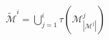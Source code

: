 \documentclass[preview]{standalone}
\begin{document}
\begin{align*}
\tilde{\mathcal{M}}^{i} = \bigcup_{j=1}^{i}\tau(\mathcal{M}_{|\mathcal{M}^{j}|}^{j})
\end{align*}
\end{document}
